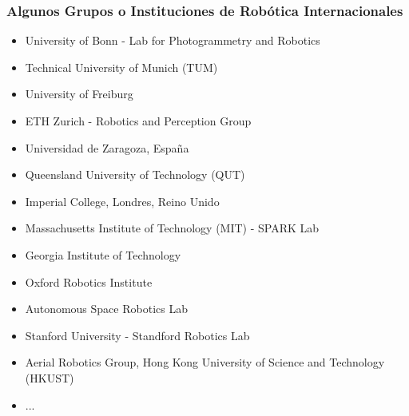 \begin{frame}
    \frametitle{Algunos Grupos o Instituciones de Robótica Internacionales}
    
   \begin{itemize}
       \item University of Bonn - Lab for Photogrammetry and Robotics
       \item Technical University of Munich (TUM)
       \item University of Freiburg
       \item ETH Zurich - Robotics and Perception Group
       \item Universidad de Zaragoza, España
       \item Queensland University of Technology (QUT)
       \item Imperial College, Londres, Reino Unido
       \item Massachusetts Institute of Technology (MIT) - SPARK Lab
       \item Georgia Institute of Technology
       \item Oxford Robotics Institute
       \item Autonomous Space Robotics Lab
       \item Stanford University - Standford Robotics Lab
       \item Aerial Robotics Group, Hong Kong University of Science and Technology (HKUST)
       \item ...
   \end{itemize}
   
\end{frame}

